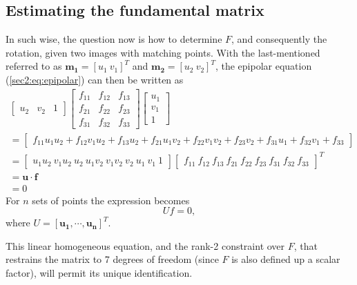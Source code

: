 \subsection{Estimating the fundamental matrix}
\label{einvonrev}
In such wise, the question now is how to determine $F$, and consequently the rotation, given two images with matching points. With the last-mentioned referred to as $\mathbf{m_{1}} = [u_{1} \ v_{1}]^T$ and $\mathbf{m_{2}} = [u_{2}  \ v_{2}]^T$, the epipolar equation (\ref{sec2:eq:epipolar}) can then be written as
\begin{equation}
\begin{aligned}
\begin{bmatrix}
u_2 & v_2 & 1
\end{bmatrix}
\begin{bmatrix}
f_{11} & f_{12} & f_{13}  \\
f_{21} & f_{22} & f_{23}  \\
f_{31} & f_{32} & f_{33} 
\end{bmatrix}
\begin{bmatrix}
u_{1} \\ v_{1} \\ 1
\end{bmatrix}\\
=
\begin{bmatrix}
f_{11} u_1 u_2 + f_{12} v_1 u_2  + f_{13}u_2 + f_{21} u_1 v_2  + f_{22} v_1 v_2  + f_{23}v_2  + f_{31} u_1 + f_{32} v_1 + f_{33} 
\end{bmatrix}\\
=
\begin{bmatrix}
u_1u_2 \ v_1u_2 \ u_2 \ u_1v_2 \ v_1v_2 \  v_2 \ u_1 \ v_1 \ 1 
\end{bmatrix}
\begin{bmatrix}
f_{11} \ f_{12} \ f_{13} \ f_{21} \ f_{22} \ f_{23} \ f_{31} \ f_{32} \ f_{33}
\end{bmatrix}^T\\
= \mathbf{u} \cdot \mathbf{f}\\ = 0
\end{aligned}
\end{equation}
For $n$ sets of points the expression becomes 
\begin{equation}
\label{sec2:eq:nsets}
U f = 0,
\end{equation}
where $U = \left[ \mathbf{u_ { 1 }} , \cdots , \mathbf{u_ { n }} \right] ^ { T }$. 

This linear homogeneous equation, and the rank-2 constraint over $F$, that restrains the matrix to 7 degrees of freedom (since $F$ is also defined up a scalar factor), will permit its unique identification. 

